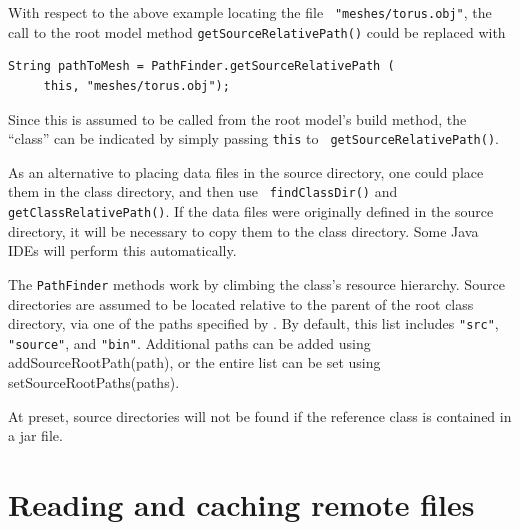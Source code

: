 With respect to the above example locating the file {\tt
"meshes/torus.obj"}, the call to the root model method 
{\tt getSourceRelativePath()} could be replaced with
%
\begin{lstlisting}[]
  String pathToMesh = PathFinder.getSourceRelativePath (
     this, "meshes/torus.obj");
\end{lstlisting}
Since this is assumed to be called from the root model's build method,
the ``class'' can be indicated by simply passing {\tt this} to {\tt
getSourceRelativePath()}.

\begin{sideblock}
As an alternative to placing data files in the source directory, one
could place them in the class directory, and then use {\tt
findClassDir()} and {\tt getClassRelativePath()}. If the data files
were originally defined in the source directory, it will be necessary
to copy them to the class directory. Some Java IDEs will perform this
automatically.
\end{sideblock}

The {\tt PathFinder} methods work by climbing the class's resource
hierarchy.  Source directories are assumed to be located relative to
the parent of the root class directory, via one of the paths specified
by . By default, this
list includes {\tt "src"}, {\tt "source"}, and {\tt "bin"}. Additional
paths can be added using
%
{addSourceRootPath(path)},
or the entire list can be set using
%
{setSourceRootPaths(paths)}.

At preset, source directories will not be found if the reference class
is contained in a jar file.

\section{Reading and caching remote files}
\label{FileManager:sec}

